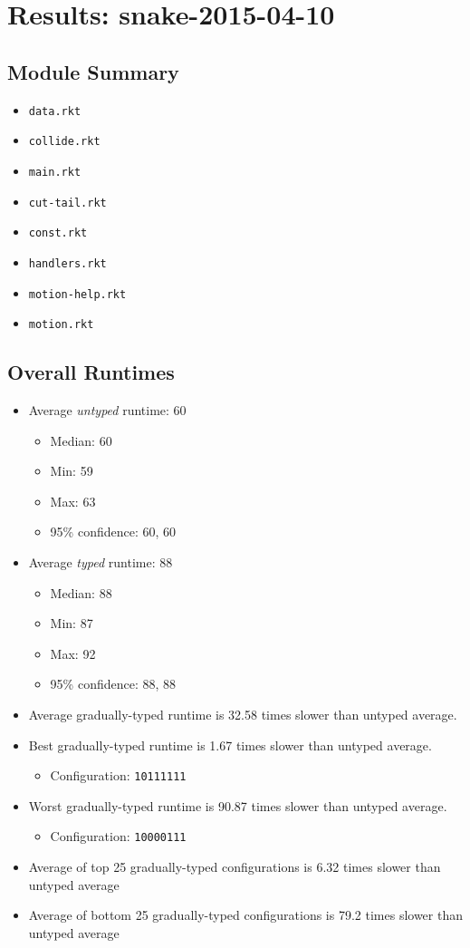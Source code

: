 \documentclass{article}
\newcommand{\mono}[1]{\texttt{#1}}
\begin{document}
\section{Results: snake-2015-04-10}

\subsection{Module Summary}
\begin{itemize}
\item \mono{data.rkt}
\item \mono{collide.rkt}
\item \mono{main.rkt}
\item \mono{cut-tail.rkt}
\item \mono{const.rkt}
\item \mono{handlers.rkt}
\item \mono{motion-help.rkt}
\item \mono{motion.rkt}\end{itemize}

\subsection{Overall Runtimes}
\begin{itemize}
\item Average \emph{untyped} runtime: 60
  \begin{itemize}
  \item Median: 60
  \item Min: 59
  \item Max: 63
  \item 95\% confidence: 60, 60
  \end{itemize}
\item Average \emph{typed} runtime: 88
  \begin{itemize}
  \item Median: 88
  \item Min: 87
  \item Max: 92
  \item 95\% confidence: 88, 88
  \end{itemize}
\item Average gradually-typed runtime is 32.58 times slower than untyped average.
\item Best gradually-typed runtime is 1.67 times slower than untyped average.
\begin{itemize}\item Configuration: \mono{10111111}\end{itemize}
\item Worst gradually-typed runtime is 90.87 times slower than untyped average.
\begin{itemize}\item Configuration: \mono{10000111}\end{itemize}
\item Average of top 25 gradually-typed configurations is 6.32 times slower than untyped average
\item Average of bottom 25 gradually-typed configurations is 79.2 times slower than untyped average
\end{itemize}
\end{document}
